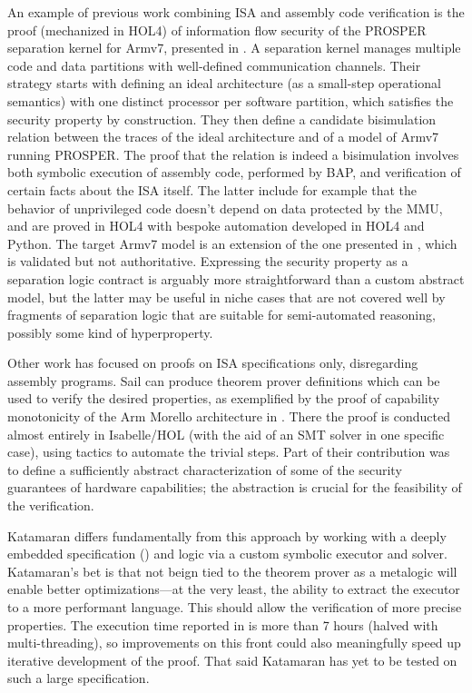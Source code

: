 An example of previous work combining ISA and assembly code verification is the proof (mechanized in HOL4) of information flow security of the PROSPER separation kernel for Armv7, presented in \cite{Dam2013}. A separation kernel manages multiple code and data partitions with well-defined communication channels. Their strategy starts with defining an ideal architecture (as a small-step operational semantics) with one distinct processor per software partition, which satisfies the security property by construction. They then define a candidate bisimulation relation between the traces of the ideal architecture and of a model of Armv7 running PROSPER. The proof that the relation is indeed a bisimulation involves both symbolic execution of assembly code, performed by BAP, and verification of certain facts about the ISA itself. The latter include for example that the behavior of unprivileged code doesn't depend on data protected by the MMU, and are proved in HOL4 with bespoke automation developed in HOL4 and Python. The target Armv7 model is an extension of the one presented in \cite{Fox2010}, which is validated but not authoritative. Expressing the security property as a separation logic contract is arguably more straightforward than a custom abstract model, but the latter may be useful in niche cases that are not covered well by fragments of separation logic that are suitable for semi-automated reasoning, possibly some kind of hyperproperty.

Other work has focused on proofs on ISA specifications only, disregarding assembly programs. Sail can produce theorem prover definitions which can be used to verify the desired properties, as exemplified by the proof of capability monotonicity of the Arm Morello architecture in \cite{Bauereiss2022}. There the proof is conducted almost entirely in Isabelle/HOL (with the aid of an SMT solver in one specific case), using tactics to automate the trivial steps. Part of their contribution was to define a sufficiently abstract characterization of some of the security guarantees of hardware capabilities; the abstraction is crucial for the feasibility of the verification.

Katamaran differs fundamentally from this approach by working with a deeply embedded specification (\usail) and logic via a custom symbolic executor and solver. Katamaran's bet is that not beign tied to the theorem prover as a metalogic will enable better optimizations---at the very least, the ability to extract the executor to a more performant language. This should allow the verification of more precise properties. The execution time reported in \cite{Bauereiss2022} is more than 7 hours (halved with multi-threading), so improvements on this front could also meaningfully speed up iterative development of the proof. That said Katamaran has yet to be tested on such a large specification.

